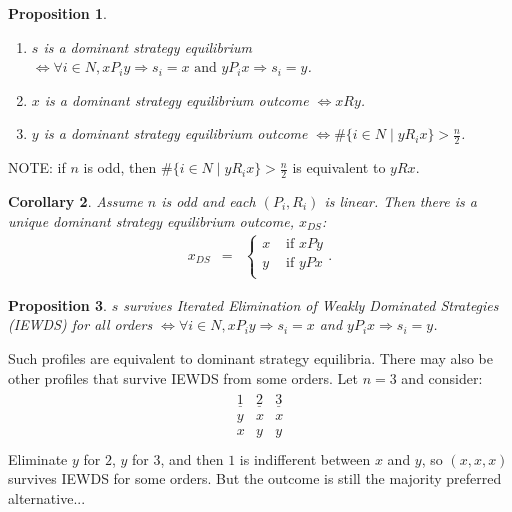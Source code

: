 \documentclass[12pt]{article}
\newtheorem{propo}{Proposition}[section]
\newtheorem{coro}[propo]{Corollary}
\newcommand{\n}{\noindent}
\newcommand{\s}{\vspace{5mm}}
\begin{document}
\noindent\begin{propo}\mbox{}
\begin{enumerate}
\item $s$ is a dominant strategy equilibrium $\Longleftrightarrow \forall i\in N, xP_iy\Rightarrow s_i=x \mbox{ and } yP_ix\Rightarrow s_i=y$.
\item $x$ is a dominant strategy equilibrium outcome $\Longleftrightarrow xRy$.
\item $y$ is a dominant strategy equilibrium outcome $\Longleftrightarrow \#\{i\in N\mid yR_ix\}>\frac{n}{2}$.
\end{enumerate}
\end{propo}
\s
\n NOTE: if $n$ is odd, then $\#\{i\in N\mid yR_ix\}>\frac{n}{2}$ is equivalent to $yRx$.

\s
\n{}\begin{coro} Assume $n$ is odd and each $(P_i,R_i)$ is linear.  Then there is a unique dominant strategy equilibrium outcome, $x_{DS}$:
\begin{eqnarray*}
x_{DS}&=&\left\{\begin{array}{cc}
x&\mbox{ if }xPy\\
y&\mbox{ if }yPx\\
\end{array}\right..
\end{eqnarray*}
\end{coro}

\s
\n\begin{propo} $s$ survives Iterated Elimination of Weakly Dominated Strategies (IEWDS) for all orders $\Longleftrightarrow \forall i \in N, xP_iy\Rightarrow s_i=x$ and $yP_ix\Rightarrow s_i=y$.
\end{propo}

\s
\n Such profiles are equivalent to dominant strategy equilibria.  There may also be other profiles that survive IEWDS from some orders. Let $n=3$ and consider:
\begin{eqnarray*}
\begin{array}{ccc}
\underline{1}&\underline{2}&\underline{3}\\
y&x&x\\
x&y&y\\
\end{array}
\end{eqnarray*}
Eliminate $y$ for $2$, $y$ for $3$, and then $1$ is indifferent between $x$ and $y$, so $(x,x,x)$ survives IEWDS for some orders.  But the outcome is still the majority preferred alternative...
\end{document}
